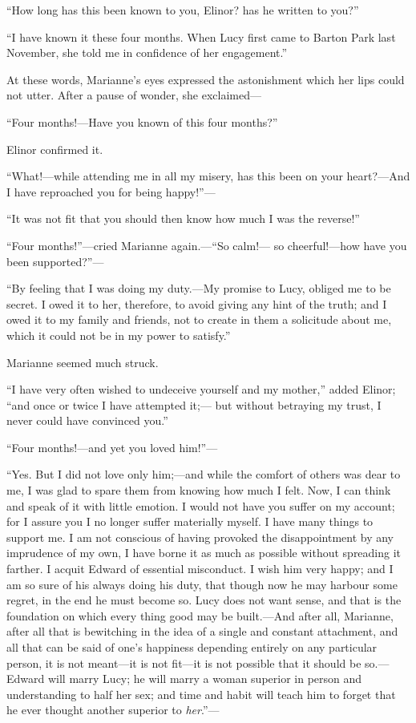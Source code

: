 \documentclass{article}
\begin{document}
``How long has this been known to you, Elinor? has
he written to you?''

``I have known it these four months.  When Lucy
first came to Barton Park last November, she told me
in confidence of her engagement.''

At these words, Marianne's eyes expressed the astonishment
which her lips could not utter.  After a pause of wonder,
she exclaimed---%

``Four months!---Have you known of this four months?''

Elinor confirmed it.

``What!---while attending me in all my misery, has this
been on your heart?---And I have reproached you for being
happy!''---%

``It was not fit that you should then know how much
I was the reverse!''

``Four months!''---cried Marianne again.---``So calm!---%
so cheerful!---how have you been supported?''---%

``By feeling that I was doing my duty.---My promise to
Lucy, obliged me to be secret.  I owed it to her, therefore,
to avoid giving any hint of the truth; and I owed it to my
family and friends, not to create in them a solicitude about me,
which it could not be in my power to satisfy.''

Marianne seemed much struck.

``I have very often wished to undeceive yourself and my
mother,'' added Elinor; ``and once or twice I have attempted it;---%
but without betraying my trust, I never could have convinced
you.''

``Four months!---and yet you loved him!''---%

``Yes. But I did not love only him;---and while the comfort
of others was dear to me, I was glad to spare them from knowing
how much I felt.  Now, I can think and speak of it with
little emotion.  I would not have you suffer on my account;
for I assure you I no longer suffer materially myself.
I have many things to support me.  I am not conscious of having
provoked the disappointment by any imprudence of my own,
I have borne it as much as possible without spreading
it farther.  I acquit Edward of essential misconduct.
I wish him very happy; and I am so sure of his always
doing his duty, that though now he may harbour some regret,
in the end he must become so.  Lucy does not want sense,
and that is the foundation on which every thing good may
be built.---And after all, Marianne, after all that is
bewitching in the idea of a single and constant attachment,
and all that can be said of one's happiness depending
entirely on any particular person, it is not meant---it
is not fit---it is not possible that it should be so.---%
Edward will marry Lucy; he will marry a woman superior
in person and understanding to half her sex; and time
and habit will teach him to forget that he ever thought
another superior to \emph{her}.''---%
\end{document}
